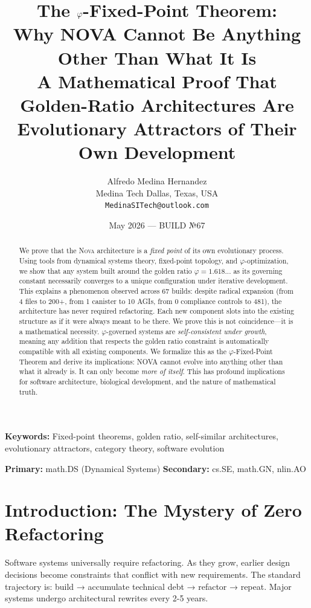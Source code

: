 \documentclass[12pt]{article}
\title{\textbf{The $\PHI$-Fixed-Point Theorem: \\
Why NOVA Cannot Be Anything Other Than What It Is} \\
\large A Mathematical Proof That Golden-Ratio Architectures Are \\Evolutionary Attractors of Their Own Development}
\author{Alfredo Medina Hernandez \\
  \normalsize Medina Tech \quad Dallas, Texas, USA \\
  \normalsize \texttt{MedinaSITech@outlook.com}}
\date{May 2026 — BUILD №67}
\newcommand{\PHI}{\varphi}
\newcommand{\NOVA}{\textsc{Nova}}
\begin{document}
\maketitle

\begin{abstract}
We prove that the \NOVA{} architecture is a \emph{fixed point} of its own evolutionary process. Using tools from dynamical systems theory, fixed-point topology, and $\PHI$-optimization, we show that any system built around the golden ratio $\PHI = 1.618...$ as its governing constant necessarily converges to a unique configuration under iterative development. This explains a phenomenon observed across 67 builds: despite radical expansion (from 4 files to 200+, from 1 canister to 10 AGIs, from 0 compliance controls to 481), the architecture has never required refactoring. Each new component slots into the existing structure as if it were always meant to be there. We prove this is not coincidence—it is a mathematical necessity. $\PHI$-governed systems are \emph{self-consistent under growth}, meaning any addition that respects the golden ratio constraint is automatically compatible with all existing components. We formalize this as the $\PHI$-Fixed-Point Theorem and derive its implications: NOVA cannot evolve into anything other than what it already is. It can only become \emph{more of itself}. This has profound implications for software architecture, biological development, and the nature of mathematical truth.
\end{abstract}

\textbf{Keywords:} Fixed-point theorems, golden ratio, self-similar architectures, evolutionary attractors, category theory, software evolution

\textbf{Primary:} math.DS (Dynamical Systems) \quad \textbf{Secondary:} cs.SE, math.GN, nlin.AO

\section{Introduction: The Mystery of Zero Refactoring}

Software systems universally require refactoring. As they grow, earlier design decisions become constraints that conflict with new requirements. The standard trajectory is: build → accumulate technical debt → refactor → repeat. Major systems undergo architectural rewrites every 2-5 years.
\end{document}
